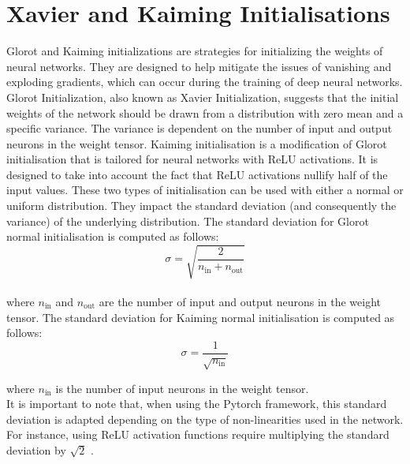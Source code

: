 \section{Xavier and Kaiming Initialisations}
\label{sec:appendix:xavier_init}
Glorot and Kaiming initializations are strategies for initializing the weights
of neural networks. They are designed to help mitigate the issues of vanishing
and exploding gradients, which can occur during the training of deep neural
networks.\\

Glorot Initialization, also known as Xavier Initialization, suggests that the
initial weights of the network should be drawn from a distribution with zero
mean and a specific variance. The variance is dependent on the number of input
and output neurons in the weight tensor. Kaiming initialisation is a
modification of Glorot initialisation that is tailored for neural networks with
ReLU activations. It is designed to take into account the fact that ReLU
activations nullify half of the input values. These two types of initialisation
can be used with either a normal or uniform distribution. They impact the
standard deviation (and consequently the variance) of the underlying
distribution. The standard deviation for Glorot normal initialisation is
computed as follows:\\

\begin{equation}
    \sigma = \sqrt{\frac{2}{n_\text{in} + n_\text{out}}}
\end{equation}\\

where $n_\text{in}$ and $n_\text{out}$ are the number of input and output
neurons in the weight tensor. The standard deviation for Kaiming normal
initialisation is computed as follows:\\

\begin{equation}
    \sigma = \frac{1}{\sqrt{n_\text{in}}}
\end{equation}

where $n_\text{in}$ is the number of input neurons in the weight tensor.\\

It is important to note that, when using the Pytorch framework, this standard
deviation is adapted depending on the type of non-linearities used in the
network. For instance, using \ac{ReLU} activation functions require multiplying
the standard deviation by $\sqrt{2}$ \cite{pytorch_init}.\\